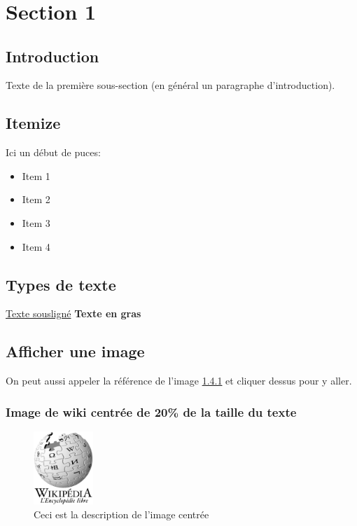 \documentclass[a4paper,french,titlepage]{article} \usepackage{knonn_layout}
\title{
    \begin{minipage}\linewidth
        \flushright\bfseries
        \Huge \titledoc
        \vskip3pt
        \LARGE \undertitle%
    \end{minipage}
}
\begin{document}

    \maketitle
    \tableofcontents
    \newpage

	\section{Section 1}
		\subsection{Introduction}
			Texte de la première sous-section (en général un paragraphe d'introduction).
		\subsection{Itemize}
			Ici un début de puces:
			\begin{itemize}
				\item Item 1
				\item Item 2
				\item Item 3
				\item Item 4
			\end{itemize}
		\subsection{Types de texte}
				\underline{Texte sousligné}
				\textbf{Texte en gras}

		\subsection{Afficher une image}
			On peut aussi appeler la référence de l'image \ref{Image centrée} et cliquer dessus pour y aller.
			\subsubsection{Image de \gls{wiki} centrée de 20\% de la taille du texte}
			\label{Image centrée}
				\begin {figure}[H]
					\begin{center}
						\includegraphics[width=0.2\textwidth]{centre.png}
					\end{center}
					\caption{Ceci est la description de l'image centrée}
					\hspace{150pt}
				\end{figure}
\end{document}
